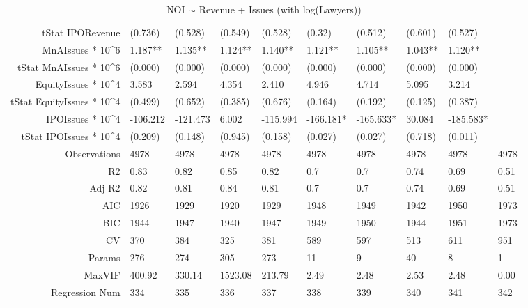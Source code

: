 \begin{table}[ht]
\begin{tabular}{rlllllllll}
  tStat IPORevenue & (0.736) & (0.528) & (0.549) & (0.528) & (0.32) & (0.512) & (0.601) & (0.527) &  \\ 
  MnAIssues * 10^6 & 1.187** & 1.135** & 1.124** & 1.140** & 1.121** & 1.105** & 1.043** & 1.120** &  \\ 
  tStat MnAIssues * 10^6 & (0.000) & (0.000) & (0.000) & (0.000) & (0.000) & (0.000) & (0.000) & (0.000) &  \\ 
  EquityIssues * 10^4 & 3.583 & 2.594 & 4.354 & 2.410 & 4.946 & 4.714 & 5.095 & 3.214 &  \\ 
  tStat EquityIssues * 10^4 & (0.499) & (0.652) & (0.385) & (0.676) & (0.164) & (0.192) & (0.125) & (0.387) &  \\ 
  IPOIssues * 10^4 & -106.212 & -121.473 & 6.002 & -115.994 & -166.181* & -165.633* & 30.084 & -185.583* &  \\ 
  tStat IPOIssues * 10^4 & (0.209) & (0.148) & (0.945) & (0.158) & (0.027) & (0.027) & (0.718) & (0.011) &  \\ 
  Observations & 4978 & 4978 & 4978 & 4978 & 4978 & 4978 & 4978 & 4978 & 4978 \\ 
  R2 & 0.83 & 0.82 & 0.85 & 0.82 & 0.7 & 0.7 & 0.74 & 0.69 & 0.51 \\ 
  Adj R2 & 0.82 & 0.81 & 0.84 & 0.81 & 0.7 & 0.7 & 0.74 & 0.69 & 0.51 \\ 
  AIC & 1926 & 1929 & 1920 & 1929 & 1948 & 1949 & 1942 & 1950 & 1973 \\ 
  BIC & 1944 & 1947 & 1940 & 1947 & 1949 & 1950 & 1944 & 1951 & 1973 \\ 
  CV & 370 & 384 & 325 & 381 & 589 & 597 & 513 & 611 & 951 \\ 
  Params & 276 & 274 & 305 & 273 & 11 & 9 & 40 & 8 & 1 \\ 
  MaxVIF & 400.92 & 330.14 & 1523.08 & 213.79 & 2.49 & 2.48 & 2.53 & 2.48 & 0.00 \\ 
  Regression Num & 334 & 335 & 336 & 337 & 338 & 339 & 340 & 341 & 342 \\ 
   \hline
\end{tabular}
\caption{NOI $\sim$ Revenue + Issues (with log(Lawyers))} 
\end{table}
